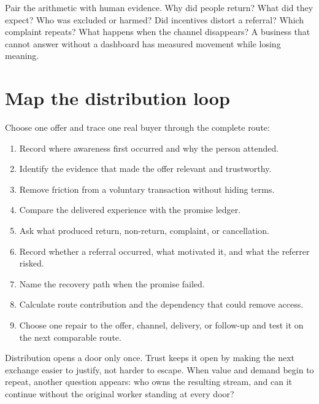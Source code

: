 Pair the arithmetic with human evidence. Why did people return? What did they
expect? Who was excluded or harmed? Did incentives distort a referral? Which
complaint repeats? What happens when the channel disappears? A business that
cannot answer without a dashboard has measured movement while losing meaning.

\section{Map the distribution loop}

Choose one offer and trace one real buyer through the complete route:

\begin{enumerate}[itemsep=0.12em]
\item Record where awareness first occurred and why the person attended.
\item Identify the evidence that made the offer relevant and trustworthy.
\item Remove friction from a voluntary transaction without hiding terms.
\item Compare the delivered experience with the promise ledger.
\item Ask what produced return, non-return, complaint, or cancellation.
\item Record whether a referral occurred, what motivated it, and what the
  referrer risked.
\item Name the recovery path when the promise failed.
\item Calculate route contribution and the dependency that could remove access.
\item Choose one repair to the offer, channel, delivery, or follow-up and test it
  on the next comparable route.
\end{enumerate}

Distribution opens a door only once. Trust keeps it open by making the next
exchange easier to justify, not harder to escape. When value and demand begin
to repeat, another question appears: who owns the resulting stream, and can it
continue without the original worker standing at every door?
